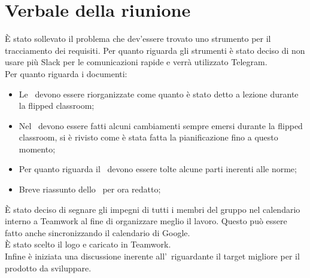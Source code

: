 \documentclass[../Riunione16-01-07.tex]{subfiles}
\begin{document}
\section{Verbale della riunione}
È stato sollevato il problema che dev'essere trovato uno strumento per il tracciamento dei requisiti. Per quanto riguarda gli strumenti è stato deciso di non usare più Slack per le comunicazioni rapide e verrà utilizzato Telegram. \\
Per quanto riguarda i documenti:
\begin{itemize}
	\item Le \normediprogetto\ devono essere riorganizzate come quanto è stato detto a lezione durante la flipped classroom;
	\item Nel \pianodiprogetto\ devono essere fatti alcuni cambiamenti sempre emersi durante la flipped classroom, si è rivisto come è stata fatta la pianificazione fino a questo momento;
	\item Per quanto riguarda il \pianodiqualifica\ devono essere tolte alcune parti inerenti alle norme;
	\item Breve riassunto dello \studiodifattibilita\ per ora redatto;
\end{itemize}
È stato deciso di segnare gli impegni di tutti i membri del gruppo nel calendario interno a Teamwork al fine di organizzare meglio il lavoro. Questo può essere fatto anche sincronizzando il calendario di Google.\\
È stato scelto il logo e caricato in Teamwork.\\
Infine è iniziata una discussione inerente all'\analisideirequisiti\ riguardante il target migliore per il prodotto da sviluppare.
\end{document}
